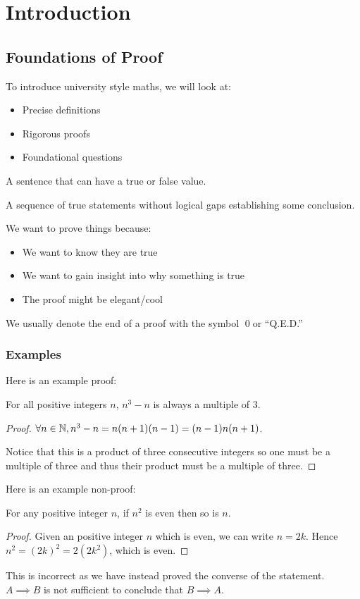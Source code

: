 \documentclass[../main.tex]{subfiles}
\begin{document}
\chapter{Introduction}
\section{Foundations of Proof}
To introduce university style maths, we will look at:
\begin{itemize}
  \item Precise definitions
  \item Rigorous proofs
  \item Foundational questions
\end{itemize}
\begin{definition}
  A sentence that can have a true or false value. 
\end{definition}
\begin{definition}[Proof]
  A sequence of true statements without logical gaps establishing some conclusion.
\end{definition}
We want to prove things because:
\begin{itemize}
  \item We want to know they are true
  \item We want to gain insight into why something is true
  \item The proof might be elegant/cool
\end{itemize}
We usually denote the end of a proof with the symbol \qed\;or ``Q.E.D.''

\subsection{Examples}
Here is an example proof:
\begin{proposition}
  For all positive integers $n$, $n^3 - n$ is always a multiple of 3.
\end{proposition}
\begin{proof}
  $\forall n \in \mathbb{N}, n^3 - n = n(n + 1)(n - 1) = (n - 1)n(n + 1)$.
  
  Notice that this is a product of three consecutive integers so one must be a multiple of three and thus their product must be a multiple of three.
\end{proof}
Here is an example non-proof:
\begin{proposition}
  For any positive integer $n$, if $n^2$ is even then so is $n$.
  \label{nEven}
\end{proposition}
\begin{proof}
  Given an positive integer $n$ which is even, we can write $n = 2k$.
  Hence $n^2 = (2k)^2 = 2(2k^2)$, which is even.
\end{proof}
This is incorrect as we have instead proved the converse of the statement.
$A \implies B$ is not sufficient to conclude that $B \implies A$.
\end{document}
